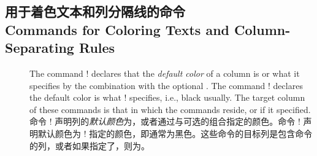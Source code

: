 \subsection{用于着色文本和列分隔线的命令\\ Commands for Coloring Texts and Column-Separating Rules}
\label{sec:ref-tcolor}

\begin{description}
\item[\Midx{\!\columncolor!}]\mbox{}
\mbox{}\par
{}
\begin{paracol}{2}
The command \!\columncolor! declares that the \emph{default color} of a
column is  or what it specifies by the combination with the
optional .  The command \!\normalcolumncolor! declares the
default color is what \!\normalcolor! specifies, i.e., black usually.  The
target column of these commands is that in which the commands reside, or
 if it specified.
\switchcolumn
命令 \!\columncolor! 声明列的\emph{默认颜色}为，或者通过与可选的组合指定的颜色。命令 \!\normalcolumncolor! 声明默认颜色为 \!\normalcolor! 指定的颜色，即通常为黑色。这些命令的目标列是包含命令的列，或者如果指定了，则为。
\end{paracol}


\end{description}
